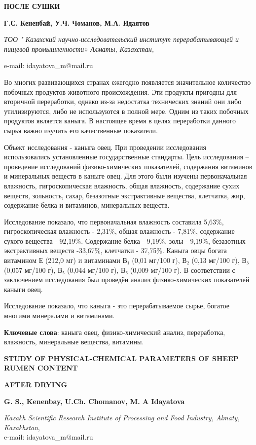 {\bfseries ПОСЛЕ СУШКИ}

{\bfseries Г.С. Кененбай, У.Ч. Чоманов, М.А. Идаятов\envelope }

\emph{ТОО " Казахский научно-исследовательский институт перерабатывающей
и пищевой промышленности» Алматы, Казахстан,}

e-mail:
idayatova_m@mail.ru

Во многих развивающихся странах ежегодно появляется значительное
количество побочных продуктов животного происхождения. Эти продукты
пригодны для вторичной переработки, однако из-за недостатка технических
знаний они либо утилизируются, либо не используются в полной мере. Одним
из таких побочных продуктов является каныга. В настоящее время в целях
переработки данного сырья важно изучить его качественные показатели.

Объект исследования - каныга овец. При проведении исследования
использовались установленные государственные стандарты. Цель
исследования -- проведение исследований физико-химических показателей,
содержания витаминов и минеральных веществ в каныге овец. Для этого были
изучены первоначальная влажность, гигроскопическая влажность, общая
влажность, содержание сухих веществ, зольность, сахар, безазотные
экстрактивные вещества, клетчатка, жир, содержание белка и витаминов,
минеральных веществ.

Исследование показало, что первоначальная влажность составила 5,63\%,
гигроскопическая влажность - 2,31\%, общая влажность - 7,81\%,
содержание сухого вещества - 92,19\%. Содержание белка - 9,19\%, золы -
9,19\%, безазотных экстрактивных веществ -33,67\%, клетчатки - 37,75\%.
Каныга овцы богата витамином Е (212,0 мг) и витаминами В₁ (0,01 мг/100
г), В₂ (0,13 мг/100 г), В₃ (0,057 мг/100 г), В₅ (0,044 мг/100 г), В₆
(0,009 мг/100 г). В соответствии с заключением исследования был проведён
анализ физико-химических показателей каныги овец.

Исследование показало, что каныга - это перерабатываемое сырье, богатое
многими минералами и витаминами.

{\bfseries Ключевые слова}: каныга овец, физико-химический анализ,
переработка, влажность, минеральные вещества, витамины.

{\bfseries STUDY OF PHYSICAL-CHEMICAL PARAMETERS OF SHEEP RUMEN CONTENT}

{\bfseries AFTER DRYING}

{\bfseries G. S., Kenenbay, U.Ch. Chomanov, M. A
Idayatova\envelope }

\emph{Kazakh Scientific Research Institute of Processing and Food
Industry, Almaty, Kazakhstan},\\
e-mail: idayatova\_m@mail.ru

